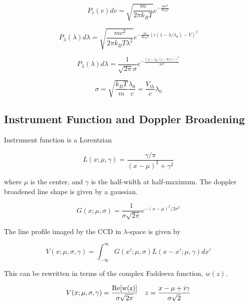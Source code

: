 \documentclass{article}
\begin{document}
\begin{equation}
P_v(v) dv = \sqrt{\frac{m}{2 \pi k_B T}} e^{- \frac{m v^2}{2 k_B T}}
\end{equation}

\begin{equation}
P_{\lambda}(\lambda) d \lambda = \sqrt{\frac{m c^2}{2 \pi k_B T \lambda^2}} e^{-\frac{m}{2 k_B T} \left(c(1-\lambda / \lambda_0 ) - V \right)^2}
\end{equation}

\begin{equation}
P_{\lambda}(\lambda) d \lambda = \frac{1}{\sqrt{2 \pi} \sigma} e^{-\frac{\left(\lambda - \lambda_0(1 - V/c)\right)^2}{2 \sigma^2}}
\end{equation}

\begin{equation}
\sigma = \sqrt{\frac{k_B T}{m}} \frac{\lambda_0}{c} = \frac{V_{th}}{c} \lambda_0
\end{equation}

\subsection{Instrument Function and Doppler Broadening}

Instrument function is a Lorentzian

\begin{equation}
L(x;\mu,\gamma) = \frac{\gamma / \pi}{(x-\mu)^2 + \gamma^2}
\end{equation}

where $\mu$ is the center, and $\gamma$ is the half-width at half-maximum.  The doppler broadened line shape is given by a gaussian.

\begin{equation}
G(x;\mu, \sigma) = \frac{1}{\sigma \sqrt{2 \pi}} e^{-(x-\mu)^2 / 2 \sigma^2}
\end{equation}

The line profile imaged by the CCD in $\lambda$-space is given by

\begin{equation}
V(x;\mu,\sigma,\gamma) = \int_{-\infty}^{\infty} G(x';\mu,\sigma) L(x-x';\mu,\gamma) dx' 
\end{equation}

This can be rewritten in terms of the complex Faddeeva function, $w(z)$.

\begin{equation}
 V(x;\mu,\sigma,\gamma) = \frac{\rm{Re}[w(z)]}{\sigma \sqrt{2 \pi}} \quad z=\frac{x - \mu + i \gamma}{\sigma \sqrt{2}}
\end{equation} 
\end{document}
